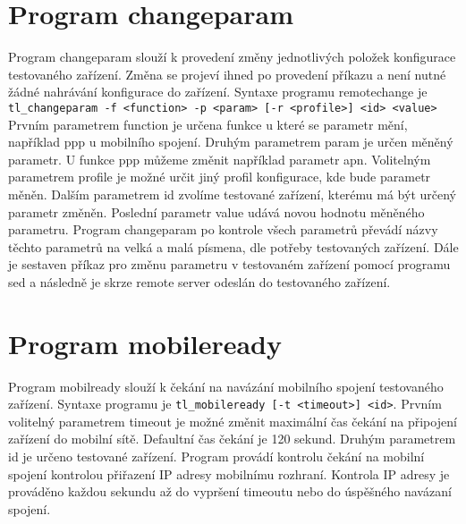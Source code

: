 \section{Program changeparam}
Program changeparam slouží k provedení změny jednotlivých položek konfigurace testovaného zařízení. Změna se projeví ihned po provedení příkazu a není nutné žádné nahrávání konfigurace do zařízení. Syntaxe programu remotechange je \texttt{tl\_changeparam -f <function> -p <param> [-r <profile>] <id> <value>} Prvním parametrem function je určena funkce u které se parametr mění, například ppp u mobilního spojení. Druhým parametrem param je určen měněný parametr. U funkce ppp můžeme změnit například parametr apn. Volitelným parametrem profile je možné určit jiný profil konfigurace, kde bude parametr měněn. Dalším parametrem id zvolíme testované zařízení, kterému má být určený parametr změněn. Poslední parametr value udává novou hodnotu měněného parametru. Program changeparam po kontrole všech parametrů převádí názvy těchto parametrů na velká a malá písmena, dle potřeby testovaných zařízení. Dále je sestaven příkaz pro změnu parametru v testovaném zařízení pomocí programu sed a následně je skrze remote server odeslán do testovaného zařízení.

\section{Program mobileready}
Program mobilready slouží k čekání na navázání mobilního spojení testovaného zařízení. Syntaxe programu je \texttt{tl\_mobileready [-t <timeout>] <id>}. Prvním volitelný parametrem timeout je možné změnit maximální čas čekání na připojení zařízení do mobilní sítě. Defaultní čas čekání je 120 sekund. Druhým parametrem id je určeno testované zařízení. Program provádí kontrolu čekání na mobilní spojení kontrolou přiřazení IP adresy mobilnímu rozhraní. Kontrola IP adresy je prováděno každou sekundu až do vypršení timeoutu nebo do úspěšného navázaní spojení.
\endinput
